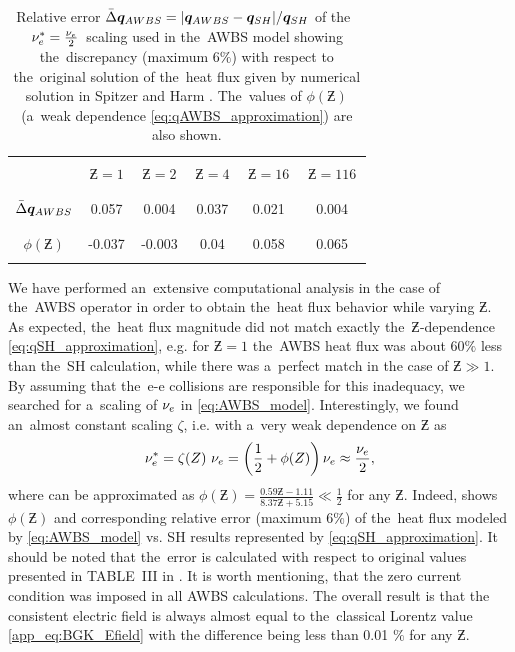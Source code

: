 \begin{table}
\begin{center}
  \begin{tabular}{c|ccccc}
    \hline\hline\\
    & $\,\Zbar=1\,$ & $\,\Zbar=2\,$ & $\,\Zbar=4\,$ & $\,\Zbar=16\,$ & $\,\Zbar=116\,$ \\\\
    \hline\\
    $\bar{\Delta}\boldsymbol{q}_{AWBS}$ & 0.057 & 0.004 & 0.037 & 0.021 & 0.004 \\\\
    \hline\\
    $\phi(\Zbar)$ & -0.037 & -0.003 & 0.04 & 0.058 & 0.065 \\\\ 
    \hline\hline
  \end{tabular}
  \caption{
  Relative error $\bar{\Delta}\boldsymbol{q}_{AWBS} = 
  |\boldsymbol{q}_{AWBS} - \boldsymbol{q}_{SH}| / \boldsymbol{q}_{SH}$ of 
  the~$\nu_{e}^* = \frac{\nu_{e}}{2}$~scaling used in the~AWBS model
   showing the~discrepancy 
  (maximum 6$\%$) with respect to the~original solution of 
  the~heat flux given by numerical solution in Spitzer and Harm 
  \cite{SpitzerHarm_PR1953}. The~values of $\phi(\Zbar)$ (a~weak dependence 
  \eqref{eq:qAWBS_approximation}) are also shown. 
  }
\label{tab:qAWBS}
\end{center}
\end{table}

We have performed an~extensive computational analysis in the case of 
the~AWBS operator in order to obtain the~heat flux behavior while varying 
$\Zbar$. As expected, the~heat flux magnitude did not match exactly 
the~$\Zbar$-dependence \eqref{eq:qSH_approximation}, e.g. for $\Zbar=1$
the~AWBS heat flux was about 60$\%$ less than the~SH calculation, while
there was a~perfect match in the case of $\Zbar\gg1$. By assuming that the~e-e
collisions are responsible for this inadequacy, we searched for a~scaling of
$\nu_{e}$ in \eqref{eq:AWBS_model}. Interestingly, we found an~almost constant
scaling $\zeta$, i.e. with a~very weak dependence on $\Zbar$ as  
\begin{equation}
  \nu_{e}^* = \zeta(Z)~\nu_{e} 
  = \left(\frac{1}{2} + \phi(Z)\right) \nu_{e} \approx \frac{\nu_{e}}{2} ,
  \label{eq:qAWBS_approximation}
\end{equation}
where can be approximated as 
$\phi(\Zbar) = \frac{0.59 \Zbar - 1.11}{8.37 \Zbar + 5.15} \ll\frac{1}{2}$ 
for any $\Zbar$.
Indeed,  shows $\phi(\Zbar)$ and corresponding relative
error (maximum 6$\%$) of the~heat flux modeled by 
\eqref{eq:AWBS_model} vs. SH results represented by 
\eqref{eq:qSH_approximation}. It should be noted that the~error is calculated 
with respect to original values presented in TABLE~III in 
\cite{SpitzerHarm_PR1953}. It is worth mentioning, that the zero current 
condition was imposed in all AWBS calculations. The overall result is that
the consistent electric field is always almost equal to the~classical Lorentz
value \eqref{app_eq:BGK_Efield} with the difference being less than 0.01 $\%$ 
for any $\Zbar$. 
 
